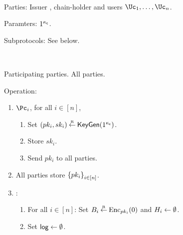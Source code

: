 \begin{protocol}~\label{prot:ConfidentialTransactions}

\item[Parties:] Issuer \Ic, chain-holder \Cc and users  $\Uc_1, \ldots,\Uc_n$.

\item[Paramters:]	$1^{\kappa_{\mathsf c}}$.

\item[Subprotocols:]  See below.
\end{protocol}


\begin{protocol}~\label{prot:ConfidentialTransactions:Init}
	\item[Participating parties.] All parties.
			
			\item Operation:
			
			
			\begin{enumerate}
				
				\item   $\Pc_i$, for  all $i\in [n]$,
				\begin{enumerate}
					\item Set $(pk_i,sk_i) \mathbin{\stackrel{\mbox{\tiny R}}{\leftarrow}} \mathsf{KeyGen}(1^{\kappa_{\mathsf c}})$.
					
					\item Store $sk_i$.
					
					\item Send $pk_i$ to all parties.
				\end{enumerate}
				
				\item All parties  store $\set{pk_i}_{i\in [n]}$.
				
				\item \Cc: 
				\begin{enumerate}
					\item 	For  all $i\in [n]$: Set $B_i\mathbin{\stackrel{\mbox{\tiny R}}{\leftarrow}} \operatorname{Enc}_{pk_i}(0)$ and $H_i\leftarrow \emptyset$.
					
					\item    Set $\mathsf{log} \leftarrow \emptyset$.
				\end{enumerate}								
			\end{enumerate}
\end{protocol}


